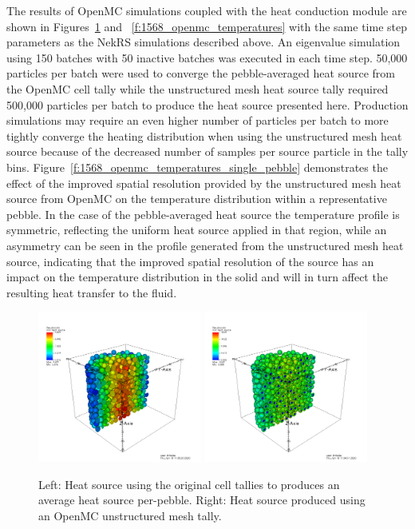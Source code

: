 The results of OpenMC simulations coupled with the heat conduction module are
shown in Figures~\ref{f:1568_openmc_heat_source} and
~\ref{f:1568_openmc_temperatures} with the same time step parameters as the
NekRS simulations described above. An eigenvalue simulation using 150 batches
with 50 inactive batches was executed in each time step. 50,000 particles per
batch were used to converge the pebble-averaged heat source from the OpenMC cell
tally while the unstructured mesh heat source tally required 500,000 particles
per batch to produce the heat source presented here. Production simulations may
require an even higher number of particles per batch to more tightly converge
the heating distribution when using the unstructured mesh heat source because of the
decreased number of samples per source particle in the tally bins.
Figure~\ref{f:1568_openmc_temperatures_single_pebble} demonstrates the effect of
the improved spatial resolution provided by the unstructured mesh heat source
from OpenMC on the temperature distribution within a representative pebble. In
the case of the pebble-averaged heat source the temperature profile is
symmetric, reflecting the uniform heat source applied in that region, while an
asymmetry can be seen in the profile generated from the unstructured mesh heat
source, indicating that the improved spatial resolution of the source has an
impact on the temperature distribution in the solid and will in turn affect the
resulting heat transfer to the fluid.

\begin{figure}[!h]
\centering
\includegraphics[clip=true,width=0.48\textwidth]{Figures/openmc_cell_heat_source}
\includegraphics[clip=true,width=0.48\textwidth]{Figures/openmc_mesh_heat_source}
\caption{Left: Heat source using the original cell tallies to produces an average heat source per-pebble. Right: Heat source produced using an OpenMC unstructured mesh tally.}
\label{f:1568_openmc_heat_source}
\end{figure}


